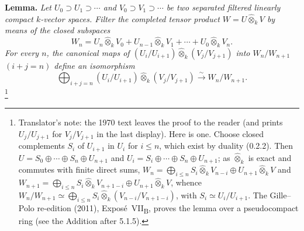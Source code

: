 \medskip
\noindent\textbf{Lemma.}
\label{sga3:VIIB:5.1.2:filtration-lemma}
{\itshape Let \(U_0\supset U_1\supset\cdots\) and
\(V_0\supset V_1\supset\cdots\) be two separated filtered linearly
compact \(k\)-vector spaces. Filter the completed tensor product
\(W=U\widehat\otimes_kV\) by means of the closed subspaces
\[
  W_n
  =
  U_n\widehat\otimes_kV_0
  +
  U_{n-1}\widehat\otimes_kV_1
  +\cdots+
  U_0\widehat\otimes_kV_n.
\]
For every \(n\), the canonical maps of
\((U_i/U_{i+1})\widehat\otimes_k(V_j/V_{j+1})\) into \(W_n/W_{n+1}\)
\((i+j=n)\) define an isomorphism
\[
  \bigoplus_{i+j=n}
  (U_i/U_{i+1})\widehat\otimes_k(V_j/V_{j+1})
  \xrightarrow{\ \sim\ }
  W_n/W_{n+1}.
\]}\footnote{Translator's note: the 1970 text leaves the proof to the reader (and prints
\(U_j/U_{j+1}\) for \(V_j/V_{j+1}\) in the last display). Here is one. Choose closed complements \(S_i\) of
\(U_{i+1}\) in \(U_i\) for \(i\leq n\), which exist by duality (0.2.2). Then
\(U=S_0\oplus\cdots\oplus S_n\oplus U_{n+1}\) and \(U_i=S_i\oplus\cdots\oplus S_n\oplus U_{n+1}\); as
\(\widehat\otimes_k\) is exact and commutes with finite direct sums,
\(W_n=\bigoplus_{i\leq n}S_i\widehat\otimes_kV_{n-i}\oplus U_{n+1}\widehat\otimes_kV\) and
\(W_{n+1}=\bigoplus_{i\leq n}S_i\widehat\otimes_kV_{n+1-i}\oplus U_{n+1}\widehat\otimes_kV\), whence
\(W_n/W_{n+1}\simeq\bigoplus_{i\leq n}S_i\widehat\otimes_k(V_{n-i}/V_{n+1-i})\), with \(S_i\simeq
U_i/U_{i+1}\). The Gille--Polo re-edition (2011), Expos\'e~VII\textsubscript{B}, proves the lemma over a
pseudocompact ring (see the Addition after 5.1.5).}
